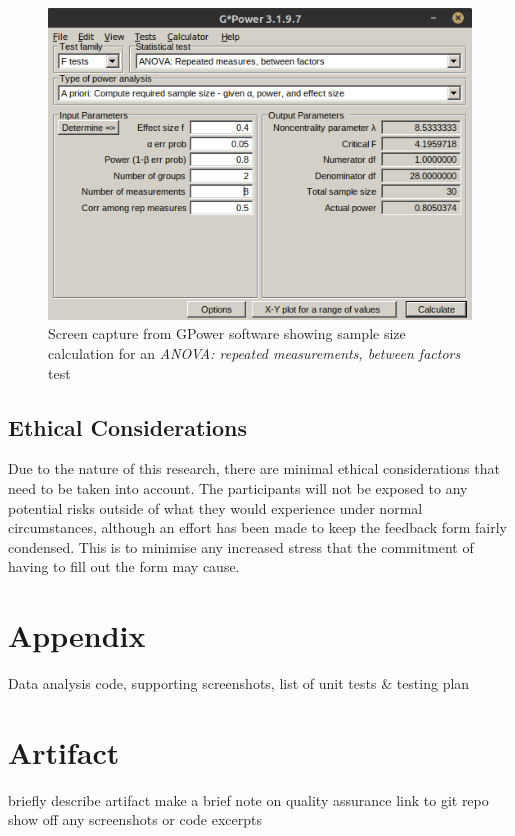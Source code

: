 \documentclass[lettersize,journal]{IEEEtran}
\begin{document}
        \begin{figure}[h!]
            \includegraphics[width=\columnwidth]{Images/ANOVA_2.png}
            \caption{Screen capture from GPower software showing sample size calculation for an \textit{ANOVA: repeated measurements, between factors} test}
            \label{ANOVArepeatedbetween}
        \end{figure}

    \subsection{Ethical Considerations}
        Due to the nature of this research, there are minimal ethical considerations that need to be taken into account. The participants will not be exposed to any potential risks outside of what they would experience under normal circumstances, although an effort has been made to keep the feedback form fairly condensed. This is to minimise any increased stress that the commitment of having to fill out the form may cause.
    
    \section{Appendix}
    Data analysis code, supporting screenshots, list of unit tests \& testing plan

\section{Artifact}
    briefly describe artifact
    make a brief note on quality assurance
    link to git repo
    show off any screenshots or code excerpts
\end{document}
